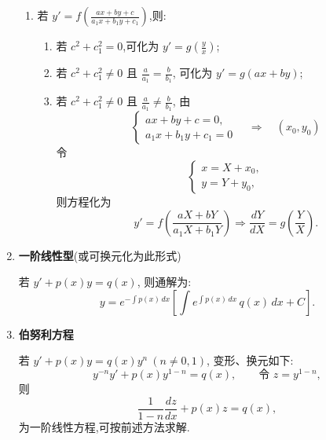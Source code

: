 \begin{enumerate}
\begin{enumerate}
              \item 若 $y' = f\!\left(\frac{ax+by+c}{a_1x+b_1y+c_1}\right)$,则:
                    \begin{enumerate}
                        \item 若 $c^2 + c_1^2 = 0$,可化为 $y' = g\!\left(\frac{y}{x}\right)$;
                        \item 若 $c^2 + c_1^2 \neq 0$ 且 $\frac{a}{a_1}=\frac{b}{b_1}$,
                              可化为 $y' = g(ax+by)$;
                        \item 若 $c^2 + c_1^2 \neq 0$ 且 $\frac{a}{a_1}\neq\frac{b}{b_1}$,
                              由
                              \[
                                  \begin{cases}
                                      ax+by+c=0, \\
                                      a_1x+b_1y+c_1=0
                                  \end{cases}
                                  \quad\Rightarrow\quad (x_0,y_0)
                              \]
                              令
                              \[
                                  \begin{cases}
                                      x = X + x_0, \\
                                      y = Y + y_0,
                                  \end{cases}
                              \]
                              则方程化为
                              \[
                                  y' = f\!\left(\frac{aX+bY}{a_1X+b_1Y}\right)
                                  \Rightarrow
                                  \frac{dY}{dX} = g\!\left(\frac{Y}{X}\right).
                              \]
                    \end{enumerate}
          \end{enumerate}

    \item \textbf{一阶线性型}(或可换元化为此形式)

          若 $y' + p(x)y = q(x)$,
          则通解为:
          \[
              y = e^{-\int p(x)\,dx}
              \left[
                  \int e^{\int p(x)\,dx}\, q(x)\,dx + C
                  \right].
          \]

    \item \textbf{伯努利方程}

          若 $y' + p(x)y = q(x) y^n \ (n\neq0,1)$,
          变形、换元如下:
          \[
              y^{-n} y' + p(x) y^{1-n} = q(x),
              \qquad
              \text{令 } z = y^{1-n},
          \]
          则
          \[
              \frac{1}{1-n}\frac{dz}{dx} + p(x)z = q(x),
          \]
          为一阶线性方程,可按前述方法求解.
\end{enumerate}

